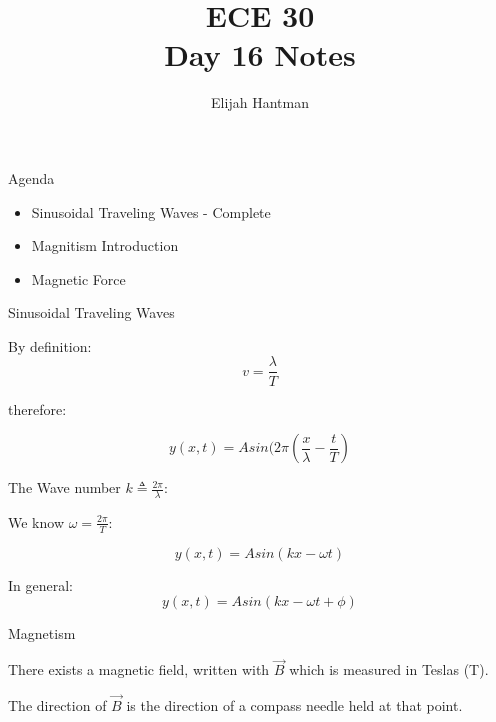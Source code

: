 \documentclass{report}
\title{\Huge{ECE 30}\\Day 16 Notes}
\author{\huge{Elijah Hantman}}
\date{}
\begin{document}
\maketitle
\newpage
\begin{description}
    \item {\large Agenda} 
        \begin{mdframed}
            \begin{itemize}
                \item Sinusoidal Traveling Waves - Complete
                \item Magnitism Introduction
                \item Magnetic Force
            \end{itemize}
        \end{mdframed}
    \item {\large Sinusoidal Traveling Waves}
        \begin{mdframed}
            By definition: 
            \begin{displaymath}
                v = \frac{\lambda}{T}
            \end{displaymath}

            therefore:

            \begin{displaymath}
                y(x,t) = A sin(2\pi (\frac{x}{\lambda} - \frac{t}{T})
            \end{displaymath}

            The Wave number $k \triangleq \frac{2\pi}{\lambda}$:

            We know  $\omega = \frac{2\pi}{T}$:

             \begin{displaymath}
                y(x,t) = A sin(kx - \omega t)
            \end{displaymath}

            In general: 
            \begin{displaymath}
                y(x,t) = A sin(kx - \omega t + \phi)
            \end{displaymath}
        \end{mdframed}
    \item {\large Magnetism}
        \begin{mdframed}
            There exists a magnetic field, written
            with $\vec{B}$ which is measured in
            Teslas (T).

            The direction of $\vec{B}$ is the direction
            of a compass needle held at that point.


\end{mdframed}
\end{description}
\end{document}
